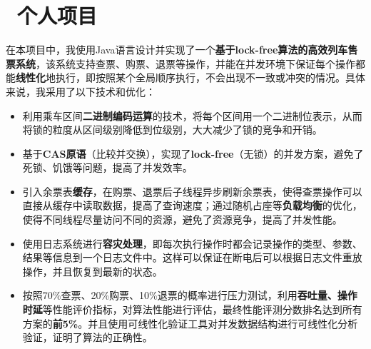 \documentclass{resume}
\begin{document}
  \section{\faUsers\ 个人项目} 
 在本项目中，我使用Java语言设计并实现了一个\textbf{基于lock-free算法的高效列车售票系统}，该系统支持查票、购票、退票等操作，并能在并发环境下保证每个操作都能\textbf{线性化}地执行，即按照某个全局顺序执行，不会出现不一致或冲突的情况。具体来说，我采用了以下技术和优化： 
 \begin{spacing}{1.2}
    \begin{itemize} 
      \item 利用乘车区间\textbf{二进制编码运算}的技术，将每个区间用一个二进制位表示，从而将锁的粒度从区间级别降低到位级别，大大减少了锁的竞争和开销。 
      \item 基于\textbf{CAS原语}（比较并交换），实现了\textbf{lock-free}（无锁）的并发方案，避免了死锁、饥饿等问题，提高了并发效率。 
      \item 引入余票表\textbf{缓存}，在购票、退票后子线程异步刷新余票表，使得查票操作可以直接从缓存中读取数据，提高了查询速度；通过随机占座等\textbf{负载均衡}的优化，使得不同线程尽量访问不同的资源，避免了资源竞争，提高了并发性能。 
      \item 使用日志系统进行\textbf{容灾处理}，即每次执行操作时都会记录操作的类型、参数、结果等信息到一个日志文件中。这样可以保证在断电后可以根据日志文件重放操作，并且恢复到最新的状态。 
      \item 按照70\%查票、20\%购票、10\%退票的概率进行压力测试，利用\textbf{吞吐量、操作时延}等性能评价指标，对算法性能进行评估，最终性能评测分数排名达到所有方案的\textbf{前5\%}。并且使用可线性化验证工具对并发数据结构进行可线性化分析验证，证明了算法的正确性。 
    \end{itemize} 
  \end{spacing}


\end{document}

